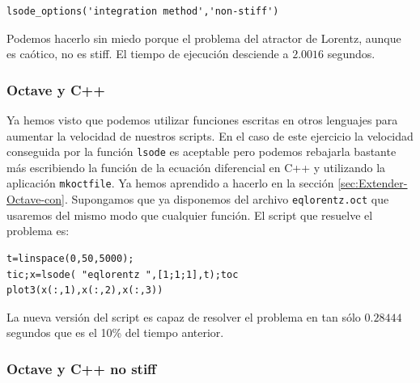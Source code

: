 \begin{verbatim}
lsode_options('integration method','non-stiff')
\end{verbatim}
Podemos hacerlo sin miedo porque el problema del atractor de Lorentz,
aunque es caótico, no es stiff. El tiempo de ejecución desciende a
$2.0016$ segundos.


\subsubsection{Octave y C++}

Ya hemos visto que podemos utilizar funciones escritas en otros
lenguajes para aumentar la velocidad de nuestros scripts. En el caso
de este ejercicio la velocidad conseguida por la función
\texttt{lsode} es aceptable pero podemos rebajarla bastante más
escribiendo la función de la ecuación diferencial en C++ y utilizando
la aplicación \texttt{mkoctfile}.  Ya hemos aprendido a hacerlo en la
sección \ref{sec:Extender-Octave-con}.  Supongamos que ya disponemos
del archivo \texttt{eqlorentz.oct} que usaremos del mismo modo que
cualquier función. El script que resuelve el problema es:

\begin{verbatim}
t=linspace(0,50,5000);
tic;x=lsode( "eqlorentz ",[1;1;1],t);toc
plot3(x(:,1),x(:,2),x(:,3))
\end{verbatim}

La nueva versión del script es capaz de resolver el problema en tan
sólo $0.28444$ segundos que es el 10\% del tiempo anterior.


\subsubsection{Octave y C++ no stiff}

